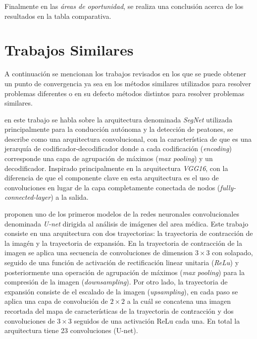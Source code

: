 Finalmente en las \emph{áreas de oportunidad}, se realiza una conclusión acerca de los resultados en la tabla comparativa.

\section{Trabajos Similares}

A continuación se mencionan los trabajos revisados en los que se puede obtener un punto de convergencia ya sea en los métodos similares utilizados para resolver problemas diferentes o en su defecto métodos distintos para resolver problemas similares.

\citet{DBLP:journals/corr/BadrinarayananK15} en este trabajo se habla sobre la arquitectura denominada \emph{SegNet} utilizada principalmente para la conducción autónoma y la detección de peatones, se describe como una arquitectura convolucional, con la característica de que es una jerarquía de codificador-decodificador donde a cada codificación (\emph{encoding}) corresponde una capa de agrupación de máximos (\emph{max pooling}) y un decodificador. Inspirado principalmente en la arquitectura \emph{VGG16}, con la diferencia de que el componente clave en esta arquitectura es el uso de convoluciones en lugar de la capa completamente conectada de nodos (\emph{fully-connected-layer}) a la salida.

\citet{DBLP:journals/corr/RonnebergerFB15} proponen uno de los primeros modelos de la redes neuronales convolucionales denominada \emph{U-net} dirigida al análisis de imágenes del area médica. Este trabajo consiste en una arquitectura con dos trayectorias: la trayectoria de contracción de la imagén y la trayectoria de expansión. En la trayectoria de contracción de la imagen se aplica una secuencia de convoluciones de dimension $3 \times 3$ con solapado, seguido de una función de activación de rectificación linear unitaria (\emph{ReLu}) y posteriormente una operación de agrupación de máximos (\emph{max pooling}) para la compresión de la imagen (\emph{downsampling}). Por otro lado, la trayectoria de expansión consiste de el escalado de la imagen (\emph{upsampling}), en cada paso se aplica una capa de convolución de $2 \times 2$ a la cuál se concatena una imagen recortada del mapa de características de la trayectoria de contracción y dos convoluciones de $3 \times 3$ seguidos de una activación ReLu cada una. En total la arquitectura tiene 23 convoluciones (U-net).

